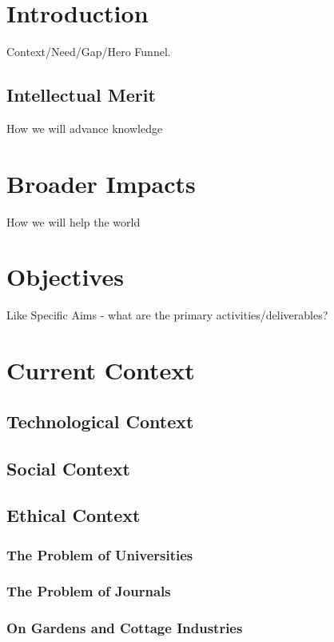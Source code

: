 \documentclass[11pt]{article}
\begin{document}
\pagestyle{empty} 
\setlength{\baselineskip}{12.6pt} 


\section{Introduction\label{sec:intro}}
Context/Need/Gap/Hero Funnel. \cite{matthis_retinal_2022}


\subsection{Intellectual Merit\label{sec:IM}}
How we will advance knowledge 


\section{Broader Impacts\label{sec:BI}}
How we will help the world

\section{Objectives}
 Like Specific Aims - what are the primary activities/deliverables?

\newpage

\section{Current Context}
\subsection{Technological Context}
\subsection{Social Context}
\subsection{Ethical Context}
\subsubsection{The Problem of Universities}
\subsubsection{The Problem of Journals}
\subsubsection{On Gardens and Cottage Industries}
\end{document}
